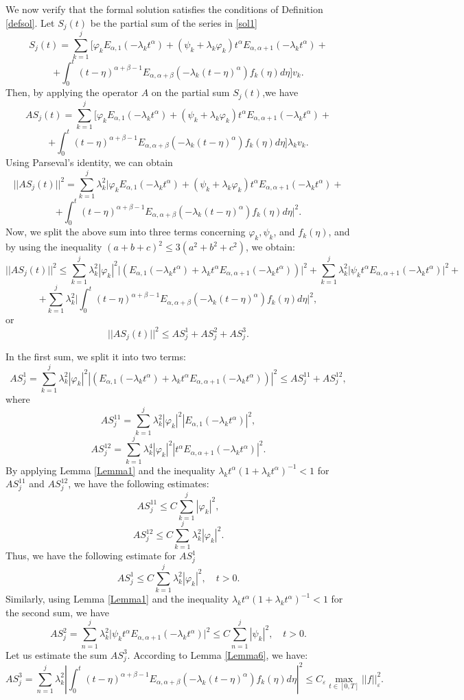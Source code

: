 \documentclass{amsart}
\numberwithin{equation}{section}
\begin{document}
We now verify that the formal solution satisfies the conditions of Definition \ref{defsol}.
Let $S_j(t)$  be the partial sum of the series in \eqref{sol1}
$$
S_j(t)=\sum_{k=1}^j \bigg[\varphi_k E_{\alpha,1}(-\lambda_k t^\alpha)+(\psi_k+\lambda_k \varphi_k)t^\alpha E_{\alpha,\alpha+1}(-\lambda_k t^\alpha)+
$$
$$
    +\int_0^t (t-\eta)^{\alpha+\beta-1} E_{\alpha,\alpha+\beta}(-\lambda_k (t-\eta)^\alpha)f_k(\eta) d\eta\bigg]  v_k .
$$
Then, by applying the operator $A$ on the partial sum $S_j(t)$,we have
$$    A S_j(t)=\sum_{k=1}^j \bigg[\varphi_k E_{\alpha,1}(-\lambda_k t^\alpha)+(\psi_k+\lambda_k \varphi_k)t^\alpha E_{\alpha,\alpha+1}(-\lambda_k t^\alpha)+$$
\begin{equation}\label{Asj}
    +\int_0^t (t-\eta)^{\alpha+\beta-1} E_{\alpha,\alpha+\beta}(-\lambda_k (t-\eta)^\alpha)f_k(\eta) d\eta\bigg] \lambda_k v_k .
\end{equation}
Using Parseval's identity, we can obtain
$$
||A S_j(t)||^2=\sum_{k=1}^j \lambda_k^2 \bigg|\varphi_k E_{\alpha,1}(-\lambda_k t^\alpha)+(\psi_k+\lambda_k \varphi_k)t^\alpha E_{\alpha,\alpha+1}(-\lambda_k t^\alpha)+
$$
$$
+\int_0^t (t-\eta)^{\alpha+\beta-1}E_{\alpha,\alpha+\beta}(-\lambda_k(t-\eta)^\alpha)f_k(\eta) d\eta\bigg|^2.
$$
Now, we split the above sum into three terms concerning $\varphi_k,\psi_k$, and $f_k(\eta)$, and by using the inequality
$(a+b+c)^2 \leq 3(a^2+b^2+c^2)$, we obtain:
$$   ||A S_j(t)||^2\leq \sum_{k=1}^j \lambda_k^2|\varphi_k|^2 \big|\left( E_{\alpha,1}(-\lambda_k t^\alpha)+\lambda_k  t^\alpha E_{\alpha,\alpha+1}(-\lambda_k t^\alpha) \right)\big|^2+\sum_{k=1}^j \lambda_k^2 \big|\psi_k t^\alpha E_{\alpha,\alpha+1}(-\lambda_k t^\alpha)\big|^2+
$$
$$
+\sum_{k=1}^j \lambda_k^2 \bigg|\int_0^t (t-\eta)^{\alpha+\beta-1}E_{\alpha,\alpha+\beta}(-\lambda_k(t-\eta)^\alpha)f_k(\eta) d\eta\bigg|^2,
$$
 or $$||A S_j(t)||^2\leq AS_j^1+AS_j^2+AS_j^3.$$

In the first sum, we split it into two terms:
$$
AS_j^1=\sum_{k=1}^j\lambda_k^2|\varphi_k|^2 \left|\left( E_{\alpha,1}(-\lambda_k t^\alpha)+\lambda_k  t^\alpha E_{\alpha,\alpha+1}(-\lambda_k t^\alpha) \right)\right|^2\leq AS_j^{11}+AS_j^{12},
$$where $$AS_j^{11}=\sum_{k=1}^j\lambda_k^2 |\varphi_k|^2 |E_{\alpha,1}(-\lambda_k t^\alpha)|^2,$$ $$AS_j^{12}=\sum_{k=1}^j\lambda_k^4|\varphi_k|^2|t^\alpha E_{\alpha,\alpha+1}(-\lambda_k t^\alpha)|^2.$$
By applying Lemma \ref{Lemma1} and the inequality $\lambda_k t^\alpha(1+\lambda_k t^\alpha)^{-1}<1$ for $AS_j^{11}$ and $AS_j^{12}$, we have the following  estimates:
$$AS_j^{11}\leq C\sum_{k=1}^j|\varphi_k|^2,
$$
$$AS_j^{12}\leq C\sum_{k=1}^j\lambda_k^2|\varphi_k|^2.$$ Thus, we have the following estimate for $AS_j^1$
$$AS_j^1\leq C\sum_{k=1}^j \lambda_k^2 |\varphi_k|^2, \quad t>0.
$$
Similarly, using Lemma \ref{Lemma1} and the inequality $\lambda_k t^\alpha(1+\lambda_k t^\alpha)^{-1}<1$ for the second sum, we have
$$
AS_j^2=\sum_{n=1}^j \lambda_k^2 \big|\psi_k t^\alpha E_{\alpha,\alpha+1}(-\lambda_k t^\alpha) \big|^2\leq C\sum_{n=1}^j |\psi_k|^2, \quad t>0.
$$
Let us estimate the sum $AS_j^3$. According to Lemma \ref{Lemma6},
we have:
$$
AS_j^3=\sum_{n=1}^j \lambda_k^2 \left|\int_0^t (t-\eta)^{\alpha+\beta-1}E_{\alpha,\alpha+\beta}(-\lambda_k (t-\eta)^\alpha)f_k(\eta) d\eta\right|^2 \leq C_\varepsilon \max_{t\in[0,T]} ||f||_\varepsilon^2.
$$
\end{document}
